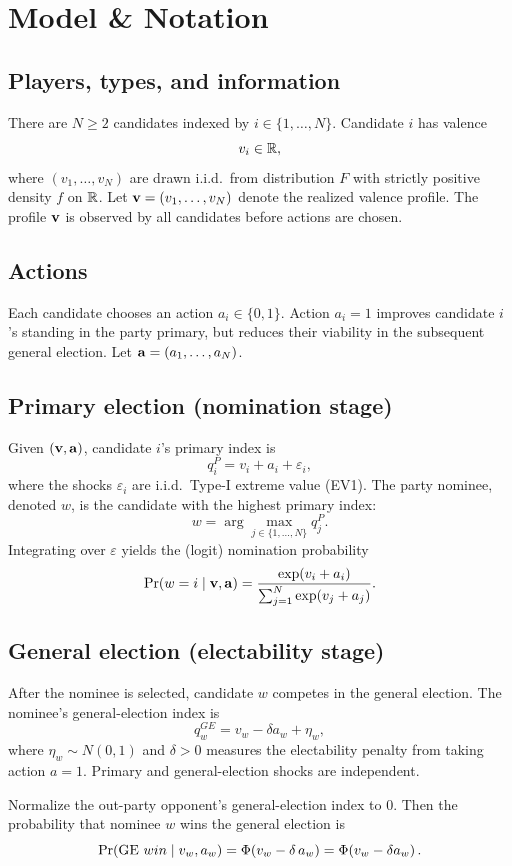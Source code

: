 \section{Model \& Notation}

\subsection{Players, types, and information}
There are $N \ge 2$ candidates indexed by $i\in\{1,\dots,N\}$. Candidate $i$ has valence
\[
    v_i \in \mathbb{R},
\]
where $(v_1,\dots,v_N)$ are drawn i.i.d.\ from distribution $F$ with strictly positive density $f$ on $\mathbb{R}$.
Let $\mathbf v = (v_1,\dots,v_N)$ denote the realized valence profile. The profile $\mathbf v$ is observed by all candidates before actions are chosen.

\subsection{Actions}
Each candidate chooses an action $a_i \in \{0,1\}$. Action $a_i=1$ improves candidate $i$'s standing in the party primary, but reduces their viability in the subsequent general election. Let $\mathbf a=(a_1,\dots,a_N)$.

\subsection{Primary election (nomination stage)}
Given $(\mathbf v,\mathbf a)$, candidate $i$'s primary index is
\[
    q_i^P = v_i + a_i + \varepsilon_i,
\]
where the shocks $\varepsilon_i$ are i.i.d.\ Type-I extreme value (EV1). The party nominee, denoted $w$, is the candidate with the highest primary index:
\[
    w = \arg\max_{j\in\{1,\dots,N\}} q_j^P.
\]
Integrating over $\varepsilon$ yields the (logit) nomination probability
\[
    \Pr(w = i \mid \mathbf v, \mathbf a) = \frac{\exp\!\left(v_i + a_i\right)}{\sum_{j=1}^N \exp\!\left(v_j + a_j\right)}.
\]

\subsection{General election (electability stage)}
After the nominee is selected, candidate $w$ competes in the general election. The nominee's general-election index is
\[
    q_w^{GE} = v_w - \delta a_w + \eta_w,
\]
where $\eta_w \sim N(0,1)$ and $\delta>0$ measures the electability penalty from taking action $a=1$.
Primary and general-election shocks are independent.

Normalize the out-party opponent's general-election index to $0$. Then the probability that nominee $w$ wins the general election is
\[
    \Pr(\text{GE}\ win \mid v_w, a_w) = \Phi\!\left(v_w-\delta\,a_w\right) = \Phi\!\left(v_w - \delta a_w\right).
\]

